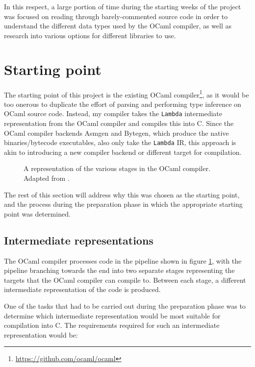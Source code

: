\documentclass[12pt,a4paper,twoside,openright]{report}
\begin{document}
In this respect, a large portion of time during the starting weeks of the 
project was focused on reading through barely-commented source code in order to
understand the different data types used by the OCaml compiler, as well as
research into various options for different libraries to use.

\section{Starting point}

The starting point of this project is the existing OCaml
compiler\footnote{\url{https://github.com/ocaml/ocaml}}, as it would be too
onerous to duplicate the effort of parsing and performing type inference on
OCaml source code. Instead, my compiler takes the \texttt{Lambda} intermediate
representation from the OCaml compiler and compiles this into C. Since the OCaml
compiler backends Asmgen and Bytegen, which produce the native binaries/bytecode
executables, also only take the \texttt{Lambda} IR, this approach is akin to
introducing a new compiler backend or different target for compilation.

\begin{figure}
    \centering
    
    \caption{A representation of the various stages in the OCaml compiler. 
    Adapted from \cite[Chapter~22]{realworldocaml}.}
    \label{fig:compilerstages}
\end{figure}

The rest of this section will address why this was chosen as the starting 
point, and the process during the preparation phase in which the appropriate 
starting point was determined.

\subsection{Intermediate representations}

The OCaml compiler processes code in the pipeline shown in figure
\ref{fig:compilerstages}, with the pipeline branching towards the end into two 
separate stages representing the targets that the OCaml compiler can compile 
to. Between each stage, a different intermediate representation of the code is 
produced.

One of the tasks that had to be carried out during the preparation phase was 
to determine which intermediate representation would be most suitable for 
compilation into C. The requirements required for such an intermediate 
representation would be:
\end{document}
